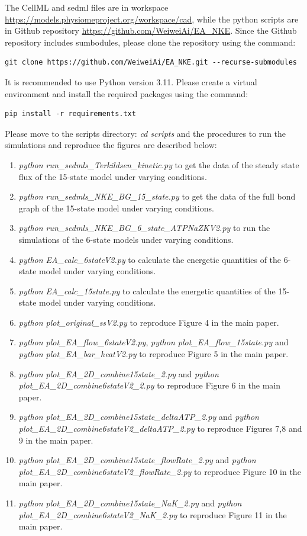 \documentclass{biophys-new}
\begin{document}
The CellML and sedml files are in workspace \url{https://models.physiomeproject.org/workspace/cad}, while the python scripts are in Github repository \url{https://github.com/WeiweiAi/EA_NKE}.
Since the Github repository includes sumbodules, please clone the repository using the command:
\begin{verbatim}
git clone https://github.com/WeiweiAi/EA_NKE.git --recurse-submodules
\end{verbatim}
It is recommended to use Python version 3.11. Please create a virtual environment and install the required packages using the command:
\begin{verbatim}
pip install -r requirements.txt
\end{verbatim}
Please move to the scripts directory: \textit{cd scripts} and the procedures to run the simulations and reproduce the figures are described below:
\begin{enumerate}
    \item \textit{python run\_sedmls\_Terkildsen\_kinetic.py} to get the data of the steady state flux of the 15-state model under varying conditions.
    \item \textit{python run\_sedmls\_NKE\_BG\_15\_state.py} to get the data of the full bond graph of the 15-state model under varying conditions.
    \item \textit{python run\_sedmls\_NKE\_BG\_6\_state\_ATPNaZKV2.py} to run the simulations of the 6-state models under varying conditions.
    \item \textit{python EA\_calc\_6stateV2.py} to calculate the energetic quantities of the 6-state model under varying conditions.
    \item \textit{python EA\_calc\_15state.py} to calculate the energetic quantities of the 15-state model under varying conditions.
    \item \textit{python plot\_original\_ssV2.py} to reproduce Figure 4 in the main paper.
    \item \textit{python plot\_EA\_flow\_6stateV2.py}, \textit{python plot\_EA\_flow\_15state.py} and \textit{python plot\_EA\_bar\_heatV2.py} to reproduce Figure 5 in the main paper.
    \item \textit{python plot\_EA\_2D\_combine15state\_2.py} and \textit{python plot\_EA\_2D\_combine6stateV2\_2.py} to reproduce Figure 6 in the main paper.
    \item \textit{python plot\_EA\_2D\_combine15state\_deltaATP\_2.py} and \textit{python plot\_EA\_2D\_combine6stateV2\_deltaATP\_2.py} to reproduce Figures 7,8 and 9 in the main paper.
    \item \textit{python plot\_EA\_2D\_combine15state\_flowRate\_2.py} and \textit{python plot\_EA\_2D\_combine6stateV2\_flowRate\_2.py} to reproduce Figure 10 in the main paper. 
    \item \textit{python plot\_EA\_2D\_combine15state\_NaK\_2.py} and \textit{python plot\_EA\_2D\_combine6stateV2\_NaK\_2.py} to reproduce Figure 11 in the main paper.  
\end{enumerate}  
\end{document}
